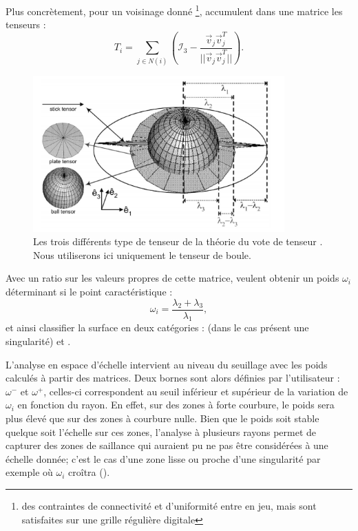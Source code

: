 Plus concrètement, pour un voisinage donné \footnote{des contraintes de
connectivité et d'uniformité entre en jeu, mais sont satisfaites sur une grille
régulière digitale},  accumulent dans une matrice les
tenseurs :
%
\begin{equation}
  T_i = \sum\limits_{j \in N(i)} \left(\mathcal{I}_3 - \frac{\overrightarrow{v}_j\overrightarrow{v}_j^T}{||\overrightarrow{v}_j\overrightarrow{v}_j^T||} \right) .
\end{equation}

\begin{figure}[ht]{
    \begin{center}
    \includegraphics[height=6cm]{images/Feature/Tensor_voting_notations}
    \end{center}}
    \caption{Les trois différents type de tenseur de la théorie du vote de tenseur \cite{Medioni2000-2}. Nous utiliserons ici uniquement le tenseur de boule.
      \label{fig:mellado-multiscale}}
\end{figure}

Avec un ratio sur les valeurs propres de cette matrice,  veulent
obtenir un poids $\omega_i$ déterminant si le point caractéristique :
%
\begin{equation}
  \omega_i = \frac{\lambda_2 + \lambda_3}{\lambda_1},
\end{equation}
%
et ainsi classifier la surface en deux catégories : \Feature (\cad dans le cas
présent une singularité) et \NonFeature.


L'analyse en espace d'échelle intervient au niveau du seuillage avec les poids
calculés à partir des matrices. Deux bornes sont alors définies par
l'utilisateur : $\omega^-$ et $\omega^+$, celles-ci correspondent au seuil
inférieur et supérieur de la variation de $\omega_i$ en fonction du rayon. En
effet, sur des zones à forte courbure, le poids sera plus élevé que sur des
zones à courbure nulle. Bien que le poids soit stable quelque soit l'échelle sur
ces zones, l'analyse à plusieurs rayons permet de capturer des zones de
saillance qui auraient pu ne pas être considérées à une échelle donnée; c'est le
cas d'une zone lisse ou proche d'une singularité par exemple où $\omega_i$ croîtra
().

